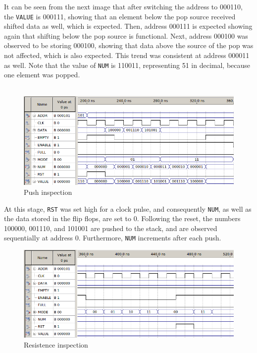 \documentclass[12pt]{report}
\begin{document}
It can be seen from the next image that after switching the address to 000110, the \texttt{VALUE} is
000111, showing that an element below the pop source received shifted data as well, which is
expected. Then, address 000111 is expected showing again that shifting below the pop source is
functional. Next, address 000100 was observed to be storing 000100, showing that data above the
source of the pop was not affected, which is also expected. This trend was consistent at address
000011 as well. Note that the value of \texttt{NUM} is 110011, representing 51 in decimal, because
one element was popped.\\\\
\begin{figure}[h]
	\begin{center}
		\caption{Push inspection}
		\includegraphics[scale=0.6]{stacktest_3}
	\end{center}
\end{figure}
At this stage, \texttt{RST} was set high for a clock pulse, and consequently \texttt{NUM}, as well
as the data stored in the flip flops, are set to 0. Following the reset, the numbers 100000, 001110,
and 101001 are pushed to the stack, and are observed sequentially at address 0. Furthermore,
\texttt{NUM} increments after each push.\\
\begin{figure}[h]
	\begin{center}
		\caption{Resistence inspection}
		\includegraphics[scale=0.6]{stacktest_4}
	\end{center}
\end{figure}
\end{document}
